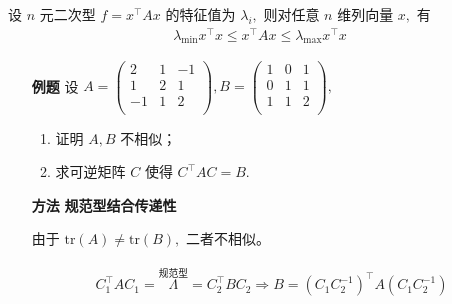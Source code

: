 
设 $ n $ 元二次型 $ f = x^\top Ax $ 的特征值为 $ \lambda_i, $ 则对任意 $ n $ 维列向量 $ x, $ 有
\begin{equation*}
    \begin{aligned}
        \lambda_{\textrm{min}} x^\top x\leq x^\top Ax\leq \lambda_{\textrm{max}}x^\top x
    \end{aligned}
\end{equation*}

\begin{enumerate}
    \item[\textbf{例题}] 设 $ A = \begin{pmatrix}
        2&1&-1\\1&2&1\\-1&1&2\\
    \end{pmatrix}, B = \begin{pmatrix}
        1&0&1\\0&1&1\\1&1&2\\
    \end{pmatrix}, $ 
    \begin{enumerate}
        \item 证明 $ A,B $ 不相似；
        \item 求可逆矩阵 $ C $ 使得 $ C^\top AC = B. $ 
    \end{enumerate}
    \item[\textbf{方法}] \textbf{规范型结合传递性}
    
    由于 $ \textrm{tr}(A)\neq \textrm{tr}(B), $ 二者不相似。

    \begin{equation*}
        \begin{aligned}
            C_1^\top AC_1 = \overset{\textrm{规范型}}\Lambda = C_2^\top BC_2 \Rightarrow
            B = (C_1C_2^{-1})^\top A(C_1C_2^{-1})
        \end{aligned}
    \end{equation*}
\end{enumerate}